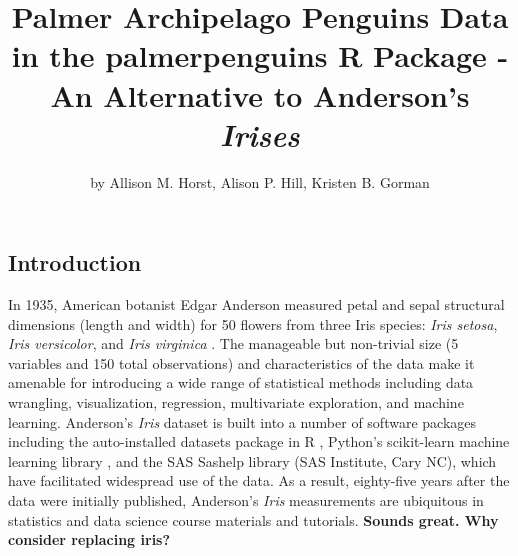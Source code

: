 \title{Palmer Archipelago Penguins Data in the palmerpenguins R Package - An
Alternative to Anderson's \emph{Irises}}
\author{by Allison M. Horst, Alison P. Hill, Kristen B. Gorman}

\maketitle


\hypertarget{introduction}{%
\subsection{Introduction}\label{introduction}}

In 1935, American botanist Edgar Anderson measured petal and sepal
structural dimensions (length and width) for 50 flowers from three Iris
species: \emph{Iris setosa}, \emph{Iris versicolor}, and \emph{Iris
virginica} \citep{anderson_irises_1935}. The manageable but non-trivial
size (5 variables and 150 total observations) and characteristics of the
data make it amenable for introducing a wide range of statistical
methods including data wrangling, visualization, regression,
multivariate exploration, and machine learning. Anderson's \emph{Iris}
dataset is built into a number of software packages including the
auto-installed datasets package in R \citep{r_core_team_r_2019},
Python's scikit-learn machine learning library
\citep{pedregosa_scikit-learn_2011}, and the SAS Sashelp library (SAS
Institute, Cary NC), which have facilitated widespread use of the data.
As a result, eighty-five years after the data were initially published,
Anderson's \emph{Iris} measurements are ubiquitous in statistics and
data science course materials and tutorials. \textbf{Sounds great. Why
consider replacing iris?}

